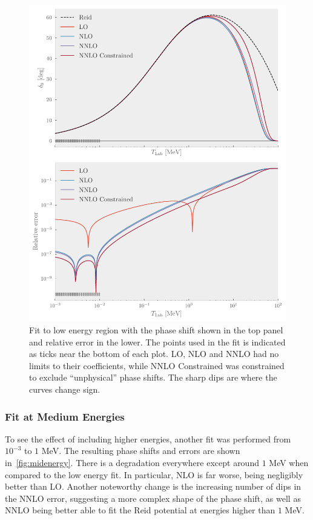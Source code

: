 \begin{figure}[pt]
  \centering
  \includegraphics{Figures/lowenergy.pdf}
  \caption{\label{fig:lowenergy} Fit to low energy region with the phase shift
    shown in the top panel and relative error in the lower. The points used in
    the fit is indicated as ticks near the bottom of each plot. LO, NLO and NNLO
  had no limits to their coefficients, while NNLO Constrained was constrained to
 exclude ``unphysical'' phase shifts. The sharp dips are where the curves change
sign.}
\end{figure}

\subsubsection{Fit at Medium Energies}

To see the effect of including higher energies, another fit was performed from \(10^{-3}\)
to \(1\) MeV. The resulting phase shifts and errors are shown
in~\cref{fig:midenergy}. There is a degradation everywhere except around \(1\) MeV
when compared to the low energy fit. In particular, NLO is far worse, being
negligibly better than LO. Another noteworthy change is the increasing number of
dips in the NNLO error, suggesting a more complex shape of the phase shift, as
well as NNLO being better able to fit the Reid potential at energies higher than \(1\) MeV.

